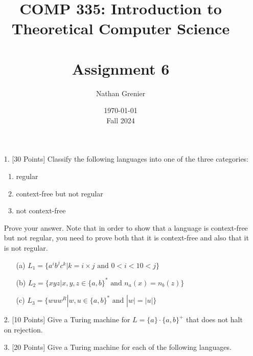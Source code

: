 \documentclass[12pt]{article}
\title{COMP 335: Introduction to Theoretical Computer Science\\
\ \\
Assignment 6}
\author{Nathan Grenier}
\date{\today \\ Fall 2024}
\begin{document}
\begin{spacing}{1.5}
      \maketitle

      \newpage

      \begin{enumerate}

            \item[1.] [30 Points] Classify the following languages into one of the three categories:
                  \begin{enumerate}
                        \item regular
                        \item context-free but not regular
                        \item not context-free
                  \end{enumerate}
                  Prove your answer. Note that in order to show that a language is context-free but not regular, you need to prove both that it is context-free and also that it is not regular.

                  \begin{enumerate}
                        \item[(a)] $L_1 = \{a^ib^jc^k | k=i\times j \text{ and } 0 < i < 10 < j\}$

                        \item[(b)] $L_2 = \{xyz | x,y,z \in \{a,b \}^* \text{ and } n_a(x)=n_b(z) \}$

                        \item[(c)] $L_3 = \{wuw^R | w,u \in \{a,b\}^* \text{ and } |w|=|u| \}$

                  \end{enumerate}

                  \newpage
            \item[2.] [10 Points] Give a Turing machine for $L=\{a \} \cdot \{a,b \}^+$ that does not halt on rejection.


                  \newpage
            \item[3.] [20 Points] Give a Turing machine for each of the following languages.


\end{enumerate}
\end{spacing}
\end{document}
